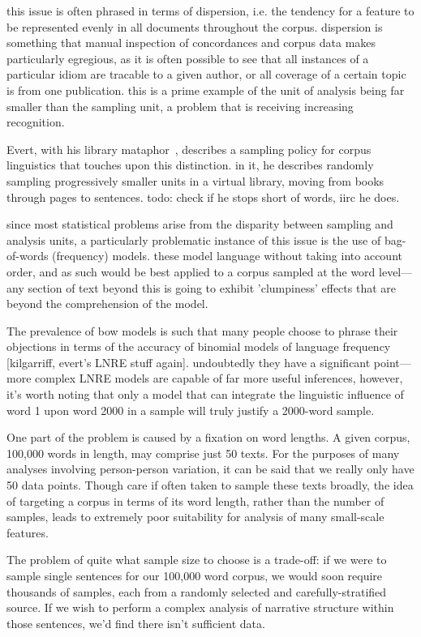 this issue is often phrased in terms of dispersion, i.e. the tendency for a feature to be represented evenly in all documents throughout the corpus.  dispersion is something that manual inspection of concordances and corpus data makes particularly egregious, as it is often possible to see that all instances of a particular idiom are tracable to a given author, or all coverage of a certain topic is from one publication.  this is a prime example of the unit of analysis being far smaller than the sampling unit, a problem that is receiving increasing recognition.

Evert, with his library mataphor~\cite{evert2006random}, describes a sampling policy for corpus linguistics that touches upon this distinction.  in it, he describes randomly sampling progressively smaller units in a virtual library, moving from books through pages to sentences.  todo: check if he stops short of words, iirc he does.

since most statistical problems arise from the disparity between sampling and analysis units, a particularly problematic instance of this issue is the use of bag-of-words (frequency) models.  these model language without taking into account order, and as such would be best applied to a corpus sampled at the word level---any section of text beyond this is going to exhibit 'clumpiness' effects that are beyond the comprehension of the model.

The prevalence of bow models is such that many people choose to phrase their objections in terms of the accuracy of binomial models of language frequency [kilgarriff, evert's LNRE stuff again]\cite{evert2004simple}\cite{evert2007zipfr}.  undoubtedly they have a significant point---more complex LNRE models are capable of far more useful inferences, however, it's worth noting that only a model that can integrate the linguistic influence of word 1 upon word 2000 in a sample will truly justify a 2000-word sample.


One part of the problem is caused by a fixation on word lengths. A given corpus, 100,000 words in length, may comprise just 50 texts. For the purposes of many analyses involving person-person variation, it can be said that we really only have 50 data points. Though care if often taken to sample these texts broadly, the idea of targeting a corpus in terms of its word length, rather than the number of samples, leads to extremely poor suitability for analysis of many small-scale features.

The problem of quite what sample size to choose is a trade-off: if we were to sample single sentences for our 100,000 word corpus, we would soon require thousands of samples, each from a randomly selected and carefully-stratified source. If we wish to perform a complex analysis of narrative structure within those sentences, we'd find there isn't sufficient data.

